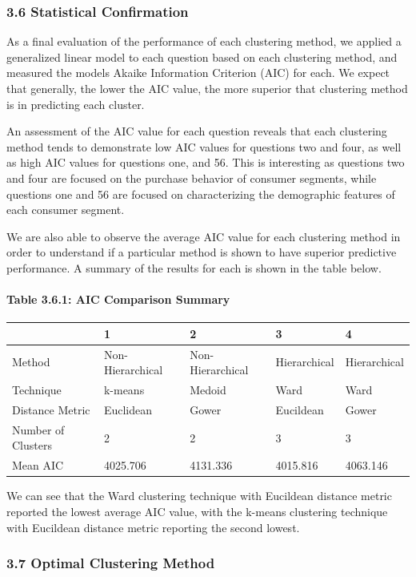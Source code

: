 \documentclass[]{article}
\let\oldparagraph\paragraph
\renewcommand{\paragraph}[1]{\oldparagraph{#1}\mbox{}}
\begin{document}
\subsubsection{3.6 Statistical
Confirmation}\label{statistical-confirmation}

As a final evaluation of the performance of each clustering method, we
applied a generalized linear model to each question based on each
clustering method, and measured the models Akaike Information Criterion
(AIC) for each. We expect that generally, the lower the AIC value, the
more superior that clustering method is in predicting each cluster.

An assessment of the AIC value for each question reveals that each
clustering method tends to demonstrate low AIC values for questions two
and four, as well as high AIC values for questions one, and 56. This is
interesting as questions two and four are focused on the purchase
behavior of consumer segments, while questions one and 56 are focused on
characterizing the demographic features of each consumer segment.

We are also able to observe the average AIC value for each clustering
method in order to understand if a particular method is shown to have
superior predictive performance. A summary of the results for each is
shown in the table below.

\newpage

\paragraph{Table 3.6.1: AIC Comparison
Summary}\label{table-3.6.1-aic-comparison-summary}

\begin{longtable}[]{@{}lllll@{}}
\toprule
& 1 & 2 & 3 & 4\tabularnewline
\midrule
\endhead
Method & Non-Hierarchical & Non-Hierarchical & Hierarchical &
Hierarchical\tabularnewline
Technique & k-means & Medoid & Ward & Ward\tabularnewline
Distance Metric & Euclidean & Gower & Eucildean & Gower\tabularnewline
Number of Clusters & 2 & 2 & 3 & 3\tabularnewline
Mean AIC & 4025.706 & 4131.336 & 4015.816 & 4063.146\tabularnewline
\bottomrule
\end{longtable}

We can see that the Ward clustering technique with Eucildean distance
metric reported the lowest average AIC value, with the k-means
clustering technique with Eucildean distance metric reporting the second
lowest.

\subsubsection{3.7 Optimal Clustering
Method}\label{optimal-clustering-method}
\end{document}
